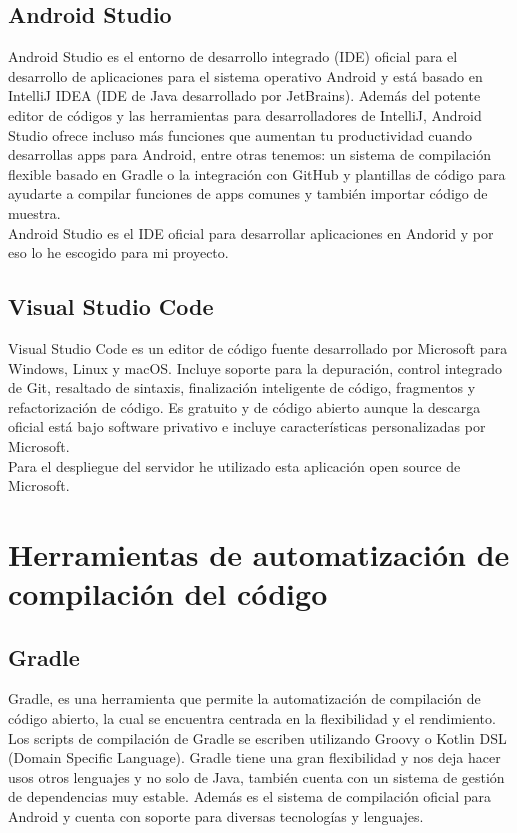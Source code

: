 \subsection{Android Studio}

Android Studio es el entorno de desarrollo integrado (IDE) oficial para el desarrollo de aplicaciones para el sistema operativo Android y está basado en IntelliJ IDEA (IDE de Java desarrollado por JetBrains). Además del potente editor de códigos y las herramientas para desarrolladores de IntelliJ, Android Studio ofrece incluso más funciones que aumentan tu productividad cuando desarrollas apps para Android, entre otras tenemos: un sistema de compilación flexible basado en Gradle o la integración con GitHub y plantillas de código para ayudarte a compilar funciones de apps comunes y también importar código de muestra.\\
Android Studio es el IDE oficial para desarrollar aplicaciones en Andorid y por eso lo he escogido para mi proyecto.

\subsection{Visual Studio Code}

Visual Studio Code es un editor de código fuente desarrollado por Microsoft para Windows, Linux y macOS. Incluye soporte para la depuración, control integrado de Git, resaltado de sintaxis, finalización inteligente de código, fragmentos y refactorización de código. Es gratuito y de código abierto aunque la descarga oficial está bajo software privativo e incluye características personalizadas por Microsoft.\\ 
Para el despliegue del servidor he utilizado esta aplicación open source de Microsoft.




\section{Herramientas de automatización de compilación del código}

\subsection{Gradle}

Gradle, es una herramienta que permite la automatización de compilación de código abierto, la cual se encuentra centrada en la flexibilidad y el rendimiento. Los scripts de compilación de Gradle se escriben utilizando Groovy o Kotlin DSL (Domain Specific Language). Gradle tiene una gran flexibilidad y nos deja hacer usos otros lenguajes y no solo de Java, también cuenta con un sistema de gestión de dependencias muy estable. Además es el sistema de compilación oficial para Android y cuenta con soporte para diversas tecnologías y lenguajes.



